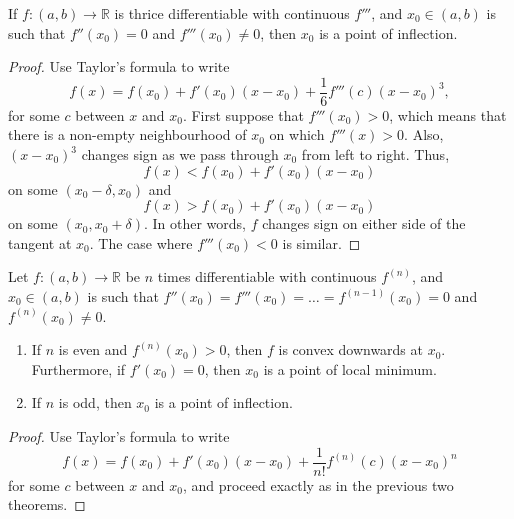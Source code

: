 \documentclass[11pt]{article}
\def\R{\mathbb{R}}
\theoremstyle{definition}
\theoremstyle{remark}
\numberwithin{equation}{module}
\begin{document}
    \begin{theorem}
        If $f\colon (a, b)\to \R$ is thrice differentiable with continuous $f'''$,
        and $x_0 \in (a, b)$ is such that $f''(x_0) = 0$ and $f'''(x_0) \neq 0$,
        then $x_0$ is a point of inflection.
    \end{theorem}
    \begin{proof}
        Use Taylor's formula to write \[
            f(x) = f(x_0) + f'(x_0)(x - x_0) + \frac{1}{6}f'''(c)(x - x_0)^3,
        \] for some $c$ between $x$ and $x_0$. First suppose that $f'''(x_0) > 0$,
        which means that there is a non-empty neighbourhood of $x_0$ on which
        $f'''(x) > 0$. Also, $(x - x_0)^3$ changes sign as we pass through $x_0$
        from left to right. Thus, \[
            f(x) < f(x_0) + f'(x_0)(x - x_0)
        \] on some $(x_0 - \delta, x_0)$ and \[
            f(x) > f(x_0) + f'(x_0)(x - x_0)
        \] on some $(x_0, x_0 + \delta)$. In other words, $f$ changes sign on either
        side of the tangent at $x_0$. The case where $f'''(x_0) < 0$ is similar.
    \end{proof}

    \begin{theorem}
        Let $f\colon (a, b)\to \R$ be $n$ times differentiable with continuous
        $f^{(n)}$, and $x_0 \in (a, b)$ is such that $f''(x_0) = f'''(x_0) = \dots =
        f^{(n - 1)}(x_0) = 0$ and $f^{(n)}(x_0) \neq 0$.
        \begin{enumerate}
            \itemsep0em
            \item If $n$ is even and $f^{(n)}(x_0) > 0$, then $f$ is convex
            downwards at $x_0$.
            Furthermore, if $f'(x_0) = 0$, then $x_0$ is a point of local minimum.
            \item If $n$ is odd, then $x_0$ is a point of inflection.
        \end{enumerate}
    \end{theorem}   
    \begin{proof}
        Use Taylor's formula to write \[
            f(x) = f(x_0) + f'(x_0)(x - x_0) + \frac{1}{n!}f^{(n)}(c)(x - x_0)^n
        \] for some $c$ between $x$ and $x_0$, and proceed exactly as in the
        previous two theorems.
    \end{proof}
\end{document}
